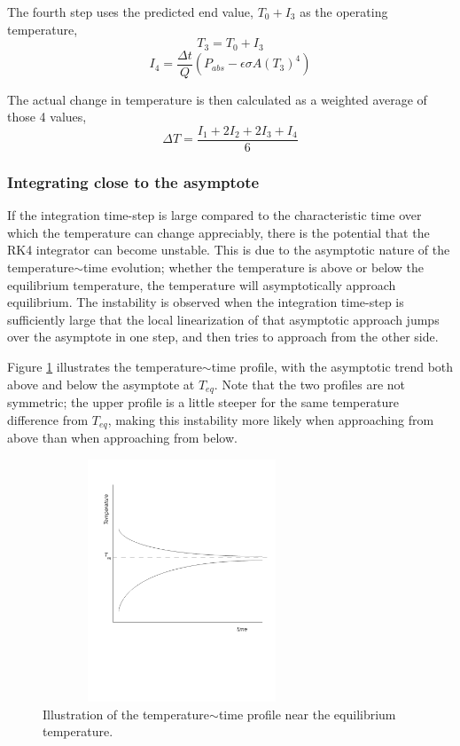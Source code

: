 The  fourth step uses the predicted end value, $T_0 + I_3$ as the
operating temperature,  
\begin{equation*}
T_3 = T_0 + I_3
\end{equation*}
\begin{equation*}
I_4 = \frac{\Delta t}{Q} \left(  P_{abs} - \epsilon \sigma A \left(T_3 \right) ^4 \right)
\end{equation*}

The actual change in temperature is then calculated as a weighted average of those 4 values,
\begin{equation*}
\Delta T = \frac{I_1+2I_2+2I_3+I_4}{6}
\end{equation*}

\subsubsection{Integrating close to the asymptote}
If the integration time-step is large compared to the characteristic time over
which the temperature can change appreciably, there is the potential that the
RK4 integrator can become unstable.  This is due to the asymptotic nature of the
temperature$\sim$time evolution; whether the temperature is above or below the
equilibrium temperature, the temperature will asymptotically approach equilibrium.  The instability is observed when the integration time-step is
sufficiently large that the local
linearization of that asymptotic approach jumps over the asymptote in one step,
and then tries to approach from the other side.

Figure \ref{fig:tempasymptote} illustrates the temperature$\sim$time profile, with the asymptotic trend both above and below the asymptote at $T_{eq}$.  Note that the two profiles are not symmetric; the upper profile is a little steeper for the same temperature difference from $T_{eq}$, making this instability more likely when approaching from above than when approaching from below.


\begin{figure}[htp]
\begin{center}
\includegraphics[width=3.2736in,height=2.85in]{figures/temp_integ.jpg}
\caption{Illustration of the temperature$\sim$time profile near the equilibrium temperature.}
\label{fig:tempasymptote}
\end{center}
\end{figure}

